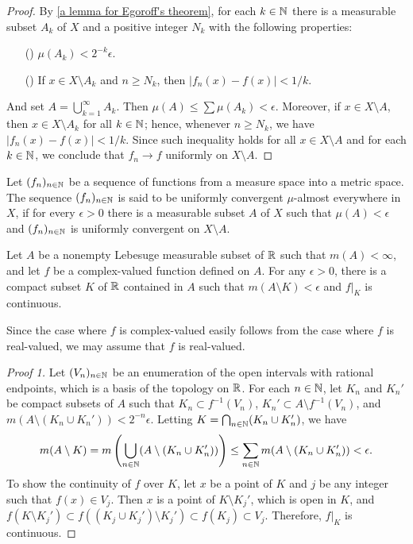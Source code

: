 \begin{proof}
    By \cref{a lemma for Egoroff's theorem}, for each $k\in{\mathbb{N}}$ there is a measurable subset $A_k$ of $X$ and a positive integer $N_k$ with the following properties:
    \begin{enumerate}
        \item[(\romannumeral 1)]
        {
            $\mu(A_k)<2^{-k}\epsilon$.
        }
        \item[(\romannumeral 2)]
        {
            If $x\in X\setminus A_k$ and $n\geq N_k$, then $|f_n(x)-f(x)|<1/k$.   
        }
    \end{enumerate}
    And set $A=\bigcup_{k=1}^\infty A_k$.
    Then $\mu(A)\leq\sum\mu(A_k)<\epsilon$.
    Moreover, if $x\in X\setminus A$, then $x\in X\setminus A_k$ for all $k\in{\mathbb{N}}$; hence, whenever $n\geq N_k$, we have $|f_n(x)-f(x)|<1/k$.
    Since such inequality holds for all $x\in X\setminus A$ and for each $k\in{\mathbb{N}}$, we conclude that $f_n\rightarrow f$ uniformly on $X\setminus A$.
\end{proof}
\begin{defi}
    Let $(f_n)_{n\in{\mathbb{N}}}$ be a sequence of functions from a measure space into a metric space.
    The sequence $(f_n)_{n\in{\mathbb{N}}}$ is said to be uniformly convergent $\mu$-almost everywhere in $X$, if for every $\epsilon>0$ there is a measurable subset $A$ of $X$ such that $\mu(A)<\epsilon$ and $(f_n)_{n\in{\mathbb{N}}}$ is uniformly convergent on $X\setminus A$.
\end{defi}

\begin{thm}
    Let $A$ be a nonempty Lebesuge measurable subset of ${\mathbb{R}}$ such that $m(A)<\infty$, and let $f$ be a complex-valued function defined on $A$.
    For any $\epsilon>0$, there is a compact subset $K$ of ${\mathbb{R}}$ contained in $A$ such that $m(A\setminus K)<\epsilon$ and $f|_K$ is continuous.
\end{thm}
\begin{rmk}
    Since the case where $f$ is complex-valued easily follows from the case where $f$ is real-valued, we may assume that $f$ is real-valued.
\end{rmk}
\begin{proof}[Proof 1]
    Let $(V_n)_{n\in{\mathbb{N}}}$ be an enumeration of the open intervals with rational endpoints, which is a basis of the topology on ${\mathbb{R}}$.
    For each $n\in{\mathbb{N}}$, let $K_n$ and $K_n'$ be compact subsets of $A$ such that $K_n\subset f^{-1}(V_n)$, $K_n'\subset A\setminus f^{-1}(V_n)$, and $m(A\setminus (K_n\cup K_n'))<2^{-n}\epsilon$.
    Letting $K=\bigcap_{n\in{\mathbb{N}}}(K_n\cup K_n')$, we have
    \begin{align*}
        m(A\setminus K)=m\left(\bigcup_{n\in{\mathbb{N}}}(A\setminus(K_n\cup K_n'))\right)\leq\sum_{n\in{\mathbb{N}}} m(A\setminus(K_n\cup K_n'))<\epsilon.
    \end{align*}
    To show the continuity of $f$ over $K$, let $x$ be a point of $K$ and $j$ be any integer such that $f(x)\in V_j$.
    Then $x$ is a point of $K\setminus K_j'$, which is open in $K$, and $f(K\setminus K_j')\subset f((K_j\cup K_j')\setminus K_j')\subset f(K_j)\subset V_j$.
    Therefore, $f|_K$ is continuous.
\end{proof}
